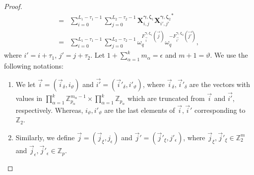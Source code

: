 \documentclass[pdflatex,sn-mathphys-num]{sn-jnl}%
\theoremstyle{thmstyleone}
\begin{document}
\begin{proof}
\begin{equation}
\begin{split}
				= &\sum_{i=0}^{L_1 -\tau_1-1} \sum_{j=0}^{L_2-\tau_2-1} \mathbf{X}^{\bm{\gamma}, \bm{\zeta}_1}_{i,j} {\mathbf{X}^{\bm{\gamma}, \bm{\zeta}_2}_{i', j'}}^*\\
				=& \sum_{i=0}^{L_1 -\tau_1-1} \sum_{j=0}^{L_2-\tau_2-1} \omega_q^{ 	F_{ \vec{i}}^{\bm{\gamma}, \bm{\zeta}_1} (\vec{j}) } \omega_q^{ 	-F_{ \vec{i'}}^{\bm{\gamma}, \bm{\zeta}_2} (\vec{j'}) },
			\end{split}
		\end{equation}
		where $i'=i+ \tau_1$, $j'=j+\tau_2$. Let $1+ \sum_{\alpha=1}^{k} m_\alpha= \epsilon$ and $m+1= \vartheta$. 
		We use the following notations:
		\begin{enumerate}
			\item We let $\vec{i}= (\vec{i}_{\delta}, i_{\vartheta}) $ and  $\vec{i'}= (\vec{i}'_{\delta}, i'_{\vartheta}) $, where $\vec{i}_{\delta}, \vec{i}'_{\delta}$ are the vectors with values in $\prod_{\alpha=1}^{k} \mathbb{Z}_{p_\alpha}^{m_\alpha-1} \times \prod_{\alpha=1}^{k} \mathbb{Z}_{p_\alpha}$ which are truncated from $\vec{i}$ and $\vec{i'}$, respectively.
			Whereas, $i_{\vartheta}, i'_{\vartheta}$ are the last elements of $\vec{i}, \vec{i}'$ corresponding to $\mathbb{Z}_2$.
			
			\item Similarly, we define $\vec{j}=(\vec{j}_{\xi}, j_{\epsilon})$ and $\vec{j}'=(\vec{j}'_{\xi}, j'_{\epsilon})$, where $\vec{j}_{\xi}, \vec{j}'_{\xi} \in \mathbb{Z}_2^m$ and $\vec{j}_{\epsilon}, \vec{j}'_{\epsilon} \in \mathbb{Z}_p$.  
			

\end{enumerate}
\end{proof}
\end{document}
